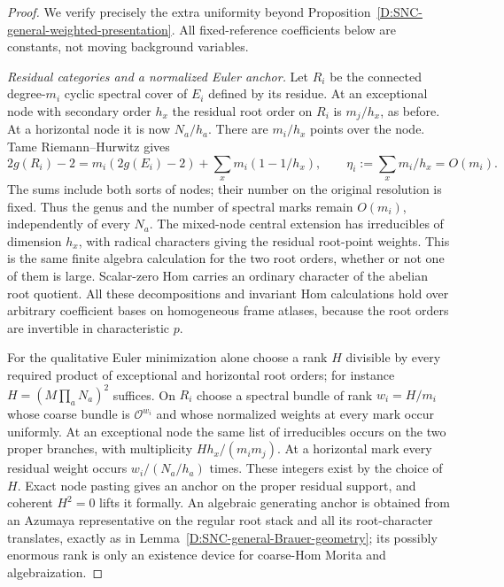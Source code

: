 \begin{proof}
We verify precisely the extra uniformity beyond
Proposition~\ref{D:SNC-general-weighted-presentation}.
All fixed-reference coefficients below are constants, not moving
background variables.

\emph{Residual categories and a normalized Euler anchor.}
Let $R_i$ be the connected degree-$m_i$ cyclic spectral cover of
$E_i$ defined by its residue. At an exceptional node with secondary
order $h_x$ the residual root order on $R_i$ is $m_j/h_x$,
as before. At a horizontal node it is now $N_a/h_a$.
There are $m_i/h_x$ points over the node. Tame Riemann--Hurwitz gives
\[
 2g(R_i)-2=m_i(2g(E_i)-2)
               +\sum_x m_i(1-1/h_x),\qquad
 \eta_i:=\sum_xm_i/h_x=O(m_i).
 \tag{D.LPT.6}
\]
The sums include both sorts of nodes; their number on the original
resolution is fixed. Thus the genus and the number of spectral
marks remain $O(m_i)$, independently of every $N_a$.
The mixed-node central extension has irreducibles of dimension
$h_x$, with radical characters giving the residual root-point
weights. This is the same finite algebra calculation for the two
root orders, whether or not one of them is large. Scalar-zero
Hom carries an ordinary character of the abelian root quotient.
All these decompositions and invariant Hom calculations hold over
arbitrary coefficient bases on homogeneous frame atlases, because
the root orders are invertible in characteristic $p$.

For the qualitative Euler minimization alone choose a rank $H$
divisible by every required product of exceptional and horizontal
root orders; for instance $H=(M\prod_aN_a)^2$ suffices.
On $R_i$ choose a spectral bundle of rank $w_i=H/m_i$ whose
coarse bundle is $\mathcal O^{w_i}$ and whose normalized weights
at every mark occur uniformly. At an exceptional node the same
list of irreducibles occurs on the two proper branches, with
multiplicity $Hh_x/(m_im_j)$. At a horizontal mark every residual
weight occurs $w_i/(N_a/h_a)$ times. These integers exist by the
choice of $H$. Exact node pasting gives an anchor on the proper
residual support, and coherent $H^2=0$ lifts it formally.
An algebraic generating anchor is obtained from an Azumaya
representative on the regular root stack and all its root-character
translates, exactly as in
Lemma~\ref{D:SNC-general-Brauer-geometry}; its possibly enormous
rank is only an existence device for coarse-Hom Morita and
algebraization.


\end{proof}
